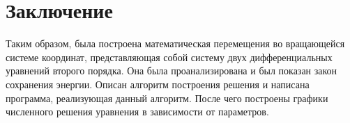 \section{Заключение}
    Таким образом, была построена математическая перемещения во вращающейся системе координат, представляющая собой систему двух дифференциальных уравнений второго порядка. Она была проанализирована и был показан закон сохранения энергии. Описан алгоритм построения решения и написана программа, реализующая данный алгоритм. После чего построены графики численного решения уравнения в зависимости от параметров.